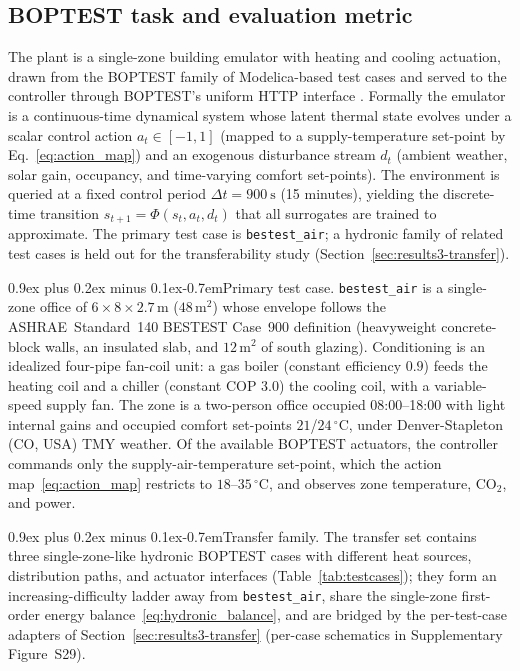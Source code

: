 \documentclass[a4paper,fleqn]{cas-sc}
\makeatletter
\renewcommand\paragraph{\@startsection{paragraph}{4}{\z@}%
 {0.9ex plus 0.2ex minus 0.1ex}{-0.7em}{\normalfont\normalsize\bfseries}}
\newcommand{\suppref}[1]{#1}
\makeatother
\begin{document}
\subsection{BOPTEST task and evaluation metric}\label{ssec:m-env}\label{ssec:m-pomdp}
The plant is a single-zone building emulator with heating and cooling actuation, drawn from the
BOPTEST family of Modelica-based test cases \citep{Blum2021BOPTEST,Wetter2014Modelica}
and served to the controller through BOPTEST's uniform HTTP interface
\citep{Arroyo2021GymBOPTEST}. Formally the emulator is a continuous-time
dynamical system whose latent thermal state evolves under a scalar control action
$a_t\in[-1,1]$ (mapped to a supply-temperature set-point by Eq.~\eqref{eq:action_map}) and an exogenous disturbance stream $d_t$ (ambient weather,
solar gain, occupancy, and time-varying comfort set-points). The environment is queried
at a fixed control period $\Delta t = \SI{900}{\second}$ (15 minutes), yielding the
discrete-time transition $s_{t+1}=\Phi(s_t,a_t,d_t)$ that all surrogates are trained
to approximate. The primary test case is \texttt{bestest\_air}; a hydronic family of
related test cases is held out for the transferability study (Section~\ref{sec:results3-transfer}).

\paragraph{Primary test case.} \texttt{bestest\_air} is a single-zone office of $6\times8\times2.7$\,m ($48$\,m$^2$) whose envelope follows the ASHRAE~Standard~140 BESTEST Case~900 definition (heavyweight concrete-block walls, an insulated slab, and $12$\,m$^2$ of south glazing). Conditioning is an idealized four-pipe fan-coil unit: a gas boiler (constant efficiency $0.9$) feeds the heating coil and a chiller (constant COP $3.0$) the cooling coil, with a variable-speed supply fan. The zone is a two-person office occupied 08:00--18:00 with light internal gains and occupied comfort set-points $21$/$24\,^\circ$C, under Denver-Stapleton (CO, USA) TMY weather. Of the available BOPTEST actuators, the controller commands only the supply-air-temperature set-point, which the action map~\eqref{eq:action_map} restricts to $18$--$35\,^\circ$C, and observes zone temperature, CO$_2$, and power.

\paragraph{Transfer family.} The transfer set contains three single-zone-like hydronic BOPTEST cases with different heat sources, distribution paths, and actuator interfaces (Table~\ref{tab:testcases}); they form an increasing-difficulty ladder away from \texttt{bestest\_air}, share the single-zone first-order energy balance~\eqref{eq:hydronic_balance}, and are bridged by the per-test-case adapters of Section~\ref{sec:results3-transfer} (per-case schematics in Supplementary Figure~\suppref{S29}).
\end{document}
